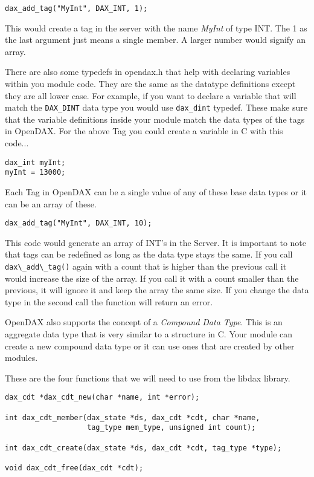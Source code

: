 \begin{verbatim}
dax_add_tag("MyInt", DAX_INT, 1);
\end{verbatim}

This would create a tag in the server with the name \textit{MyInt} of type INT.  The 1 as the last argument just means a single member.  A larger number would signify an array.

There are also some typedefs in opendax.h that help with declaring variables within you module code.  They are the same as the datatype definitions except they are all lower case.  For example, if you want to declare a variable that will match the \verb|DAX_DINT| data type you would use \verb|dax_dint| typedef.  These make sure that the variable definitions inside your module match the data types of the tags in OpenDAX.  For the above Tag you could create a variable in C with this code...

\begin{verbatim}
dax_int myInt;
myInt = 13000;
\end{verbatim}

Each Tag in OpenDAX can be a single value of any of these base data types or it can be an array of these.  

\begin{verbatim}
dax_add_tag("MyInt", DAX_INT, 10);
\end{verbatim}

This code would generate an array of INT's in the Server.  It is important to note that tags can be redefined as long as the data type stays the same.  If you call \verb|dax\_add\_tag()| again with a count that is higher than the previous call it would increase the size of the array.  If you call it with a count smaller than the previous, it will ignore it and keep the array the same size.  If you change the data type in the second call the function will return an error.

OpenDAX also supports the concept of a \textit{Compound Data Type}.  This is an aggregate data type that is very similar to a structure in C.  Your module can create a new compound data type or it can use ones that are created by other modules.

These are the four functions that we will need to use from the libdax library.

\begin{verbatim}
dax_cdt *dax_cdt_new(char *name, int *error);

int dax_cdt_member(dax_state *ds, dax_cdt *cdt, char *name,
                   tag_type mem_type, unsigned int count);

int dax_cdt_create(dax_state *ds, dax_cdt *cdt, tag_type *type);

void dax_cdt_free(dax_cdt *cdt);
\end{verbatim}

